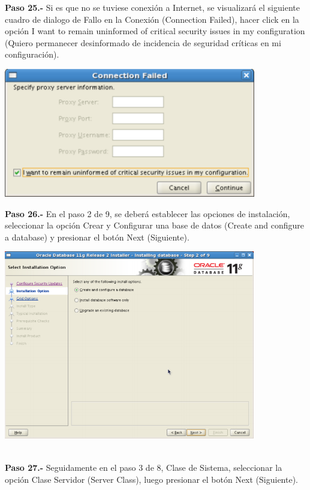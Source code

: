 \begin{enumerate}
\textbf {Paso 25.-} Si es que no se tuviese conexión a Internet, se visualizará el siguiente cuadro de dialogo de Fallo en la Conexión (Connection Failed), hacer click en la opción I want to remain uninformed of critical security issues in my configuration (Quiero permanecer desinformado de incidencia de seguridad críticas en mi configuración).

\begin{center}
  \includegraphics[width=11cm]{Imagenes/Oracle_Database/Paso_25.png}
\end{center}
\break

\textbf {Paso 26.-} En el paso 2 de 9, se deberá establecer las opciones de instalación, seleccionar la opción Crear y Configurar una base de datos (Create and configure a database) y presionar el botón Next (Siguiente).

\begin{center}
  \includegraphics[width=11cm]{Imagenes/Oracle_Database/Paso_26.png}
\end{center}
\vspace{12pt}\\

\textbf {Paso 27.-} Seguidamente en el paso 3 de 8, Clase de Sistema, seleccionar la opción Clase Servidor (Server Class), luego presionar el botón Next (Siguiente).


\end{enumerate}
